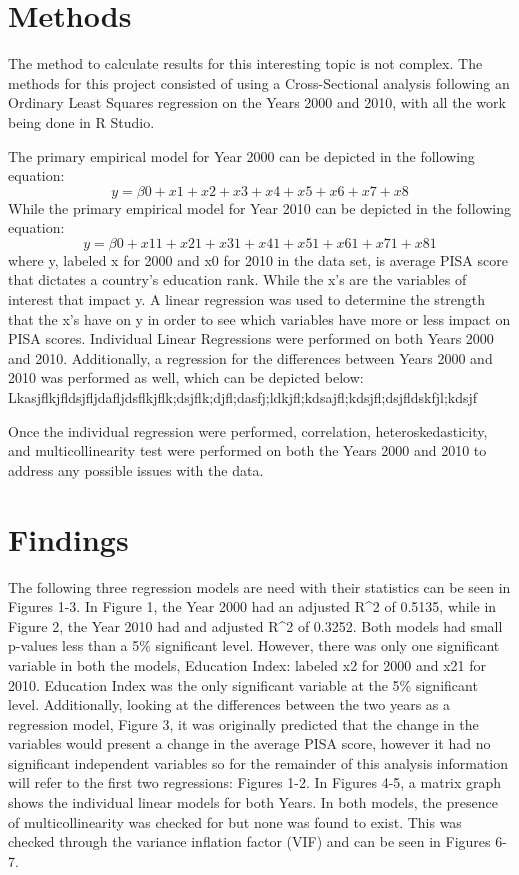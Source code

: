 \documentclass{article}
\begin{document}
\section{Methods}
The method to calculate results for this interesting topic is not complex. The methods for this project consisted of using a Cross-Sectional analysis following an Ordinary Least Squares regression on the Years 2000 and 2010, with all the work being done in R Studio.

The primary empirical model for Year 2000 can be depicted in the following equation:\\
 \[y=β0+x1+x2+x3+x4+x5+x6+x7+x8\]
While the primary empirical model for Year 2010 can be depicted in the following equation:\\
\[y=β0+x11+x21+x31+x41+x51+x61+x71+x81\]
where y, labeled x for 2000 and x0 for 2010 in the data set, is average PISA score that dictates a country’s education rank. While the x’s are the variables of interest that impact y. A linear regression was used to determine the strength that the x’s have on y in order to see which variables have more or less impact on PISA scores.
	Individual Linear Regressions were performed on both Years 2000 and 2010. Additionally, a regression for the differences between Years 2000 and 2010 was performed as well, which can be depicted below:
Lkasjflkjfldsjfljdafljdsflkjflk;dsjflk;djfl;dasfj;ldkjfl;kdsajfl;kdsjfl;dsjfldskfjl;kdsjf

Once the individual regression were performed, correlation, heteroskedasticity, and multicollinearity test were performed on both the Years 2000 and 2010 to address any possible issues with the data. 





\section{Findings}
The following three regression models are need with their statistics can be seen in Figures 1-3. In Figure 1, the Year 2000 had an adjusted R^2   of 0.5135, while in Figure 2, the Year 2010 had and adjusted R^2 of 0.3252. Both models had small p-values less than a 5\% significant level. However, there was only one significant variable in both the models, Education Index: labeled x2 for 2000 and x21 for 2010. Education Index was the only significant variable at the 5\% significant level. Additionally, looking at the differences between the two years as a regression model, Figure 3, it was originally predicted that the change in the variables would present a change in the average PISA score, however it had no significant independent variables so for the remainder of this analysis information will refer to the first two regressions: Figures 1-2. In Figures 4-5, a matrix graph shows the individual linear models for both Years.  In both models, the presence of multicollinearity was checked for but none was found to exist. This was checked through the variance inflation factor (VIF) and  can be seen in Figures 6-7.
\end{document}
